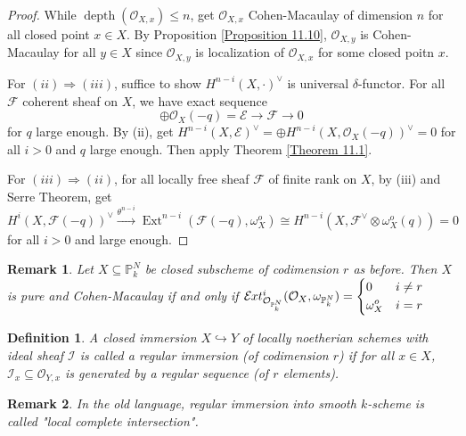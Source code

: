 \documentclass{ctexart}
\newtheorem{definition}{Definition}[section]
\newtheorem{remark}{Remark}[section]
\newcommand{\depth}{\operatorname{depth}}
\newcommand{\ext}{\operatorname{Ext}}
\newcommand{\sheafext}{\mathcal{E}\kern -.5pt xt}
\begin{document}
\begin{proof}
    While $\depth(\mathcal{O}_{X, x}) \le n$, get $\mathcal{O}_{X, x}$ Cohen-Macaulay of dimension $n$ for all closed point $x\in X$.
    By Proposition \ref{Proposition 11.10}, $\mathcal{O}_{X, y}$ is Cohen-Macaulay for all $y\in X$ since $\mathcal{O}_{X, y}$ is localization of $\mathcal{O}_{X, x}$ for some closed poitn $x$.
    \par
    For $(ii) \Rightarrow (iii)$, suffice to show $H^{n - i}(X, \cdot)^{\lor}$ is universal $\delta$-functor.
    For all $\mathcal{F}$ coherent sheaf on $X$, we have exact sequence
    \begin{equation*}
        \oplus \mathcal{O}_{X}(-q) = \mathcal{E} \longrightarrow \mathcal{F} \longrightarrow 0
    \end{equation*}
    for $q$ large enough.
    By (ii), get $H^{n - i}(X, \mathcal{E})^{\lor} = \oplus H^{n - i}(X, \mathcal{O}_{X}(-q))^{\lor} = 0$ for all $i > 0$ and $q$ large enough.
    Then apply Theorem \ref{Theorem 11.1}.
    \par
    For $(iii) \Rightarrow (ii)$, for all locally free sheaf $\mathcal{F}$ of finite rank on $X$, by (iii) and Serre Theorem, get
    \begin{equation*}
        H^{i}(X, \mathcal{F}(-q))^{\lor} \overset{\theta^{n - i}}{\longrightarrow} \ext^{n - i}(\mathcal{F}(-q), \omega_{X}^{o}) \cong H^{n - i}(X, \mathcal{F}^{\lor} \otimes \omega_{X}^{o}(q)) = 0
    \end{equation*}
    for all $i > 0$ and large enough.
\end{proof}
\begin{remark}
    Let $X \subseteq \mathbb{P}_{k}^{N}$ be closed subscheme of codimension $r$ as before.
    Then $X$ is pure and Cohen-Macaulay if and only if $\sheafext_{\mathcal{O}_{\mathbb{P}_{k}^{N}}}^{i}(\mathcal{O}_{X}, \omega_{\mathbb{P}_{k}^{N}}) = 
    \left\{
        \begin{aligned}
            & 0 & i \neq r \\
            & \omega_{X}^{o} & i = r
        \end{aligned}
    \right.$
\end{remark}
\begin{definition}
    A closed immersion $X \hookrightarrow Y$ of locally noetherian schemes with ideal sheaf $\mathcal{I}$ is called a regular immersion (of codimension $r$) if for all $x\in X$,
    $\mathcal{I}_{x} \subseteq \mathcal{O}_{Y, x}$ is generated by a regular sequence (of $r$ elements).
\end{definition}
\begin{remark}
    In the old language, regular immersion into smooth $k$-scheme is called "local complete intersection".
\end{remark}
\end{document}
